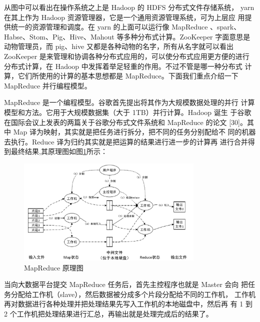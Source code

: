 \documentclass[UTF8,a4paper,10pt,nocolorlinks]{ctexart}
\begin{document}
从图中可以看出在操作系统之上是 Hadoop 的 HDFS 分布式文件存储系统，
yarn 在其上作为 Hadoop  资源管理器，它是一个通用资源管理系统，可为上层应
用提供统一的资源管理和调度。在 yarn 的上面可以运行像 MapReduce  、spark、
Habse、Stom、Pig、Hive、Mahout 等多种分布式计算。ZooKeeper 字面意思是
动物管理员，而 pig、hive 又都是各种动物的名字，所有从名字就可以看出
ZooKeeper 是来管理和协调各种分布式应用的，可以使分布式应用更方便的进行
分布式计算，在 Hadoop 中发挥着举足轻重的作用。不过不管是哪一种分布式
计算，它们所使用的计算的基本思想都是 MapReduce。下面我们重点介绍一下
MapReduce 并行编程模型。\par 
MapReduce 是一个编程模型。谷歌首先提出将其作为大规模数据处理的并行
计算模型和方法。它用于大规模数据集（大于 1TB）并行计算。Hadoop 诞生
于谷歌在国际会议上发表的两篇关于谷歌分布式文件系统和 MapReduce 的论文
[30]。其中 Map 译为映射，其实就是把任务进行拆分，把不同的任务分别配给不
同的机器去执行。Reduce 译为归约其实就是把运算的结果进行进一步的计算再
进行合并得到最终结果,其原理图如图\ref{bigdata2}所示： 
\begin{figure}[h]
  \centering %
  \includegraphics[width=0.8\textwidth]{bigdata_2.png} %
  \caption{MapReduce 原理图}
  \label{bigdata2}
\end{figure}
\par 当向大数据平台提交 MapReduce 任务后，首先主控程序也就是 Master 会向
把任务分配给工作机（slave），然后数据被分成多个片段分配给不同的工作机，
工作机再对数据进行各种处理并把处理结果先写入工作机的本地磁盘中，然后再
有 1 到 2 个工作机把处理结果进行汇总，再输出就是处理完成后的结果了。
\end{document}
